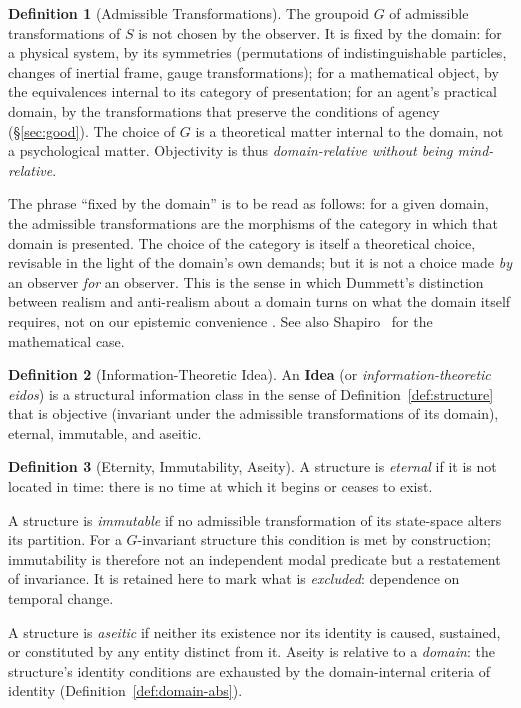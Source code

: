 \documentclass[11pt,a4paper]{article}
\theoremstyle{definition}
\newtheorem{definition}{Definition}[section]
\theoremstyle{remark}
\begin{document}
\begin{definition}[Admissible Transformations]\label{def:admissible}
The groupoid $G$ of admissible transformations of $S$ is not chosen by
the observer. It is fixed by the domain: for a physical system, by its
symmetries (permutations of indistinguishable particles, changes of
inertial frame, gauge transformations); for a mathematical object, by
the equivalences internal to its category of presentation; for an
agent's practical domain, by the transformations that preserve the
conditions of agency (\S\ref{sec:good}). The choice of $G$
is a theoretical matter internal to the domain, not a psychological
matter. Objectivity is thus \emph{domain-relative without being
mind-relative}.

The phrase ``fixed by the domain'' is to be read as follows: for a
given domain, the admissible transformations are the morphisms of the
category in which that domain is presented. The choice of the category
is itself a theoretical choice, revisable in the light of the domain's
own demands; but it is not a choice made \emph{by} an observer
\emph{for} an observer. This is the sense in which Dummett's
distinction between realism and anti-realism about a domain turns on
what the domain itself requires, not on our epistemic convenience
\cite{Dummett1978}. See also Shapiro~\cite{Shapiro1997} for the
mathematical case.
\end{definition}

\begin{definition}[Information-Theoretic Idea]\label{def:idea}
An \textbf{Idea} (or \emph{information-theoretic eidos}) is a
structural information class in the sense of
Definition~\ref{def:structure} that is objective (invariant under the
admissible transformations of its domain), eternal, immutable, and
aseitic.
\end{definition}

\begin{definition}[Eternity, Immutability, Aseity]\label{def:modal}
A structure is \emph{eternal} if it is not located in time: there is no
time at which it begins or ceases to exist.

A structure is \emph{immutable} if no admissible transformation of its
state-space alters its partition. For a $G$-invariant structure this
condition is met by construction; immutability is therefore not an
independent modal predicate but a restatement of invariance. It is
retained here to mark what is \emph{excluded}: dependence on temporal
change.

A structure is \emph{aseitic} if neither its existence nor its identity
is caused, sustained, or constituted by any entity distinct from it.
Aseity is relative to a \emph{domain}: the structure's identity
conditions are exhausted by the domain-internal criteria of identity
(Definition~\ref{def:domain-abs}).
\end{definition}
\end{document}
